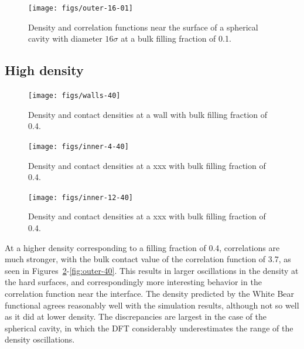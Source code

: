 \documentclass[letterpaper,twocolumn,amsmath,amssymb,jcp,10pt,aip]{revtex4-1}
\begin{document}
\begin{figure}
  \texttt{[image: figs/outer-16-01]}
  \caption{Density and correlation functions near the surface of a
    spherical cavity with diameter $16\sigma$ at a bulk filling
    fraction of 0.1.}
  \label{fig:outer-10}
\end{figure}





\subsection{High density}

\begin{figure}
  \texttt{[image: figs/walls-40]}
  \caption{Density and contact densities at a wall with bulk filling
    fraction of 0.4.}
  \label{fig:walls-40}
\end{figure}

\begin{figure}
  \texttt{[image: figs/inner-4-40]}
  \caption{Density and contact densities at a xxx with bulk filling
    fraction of 0.4.}
  \label{fig:inner-4-40}
\end{figure}

\begin{figure}
  \texttt{[image: figs/inner-12-40]}
  \caption{Density and contact densities at a xxx with bulk filling
    fraction of 0.4.}
  \label{fig:inner-12-40}
\end{figure}

At a higher density corresponding to a filling fraction of 0.4,
correlations are much stronger, with the bulk contact value of the
correlation function of 3.7, as seen in
Figures~\ref{fig:walls-40}-\ref{fig:outer-40}.  This results in larger
oscillations in the density at the hard surfaces, and correspondingly
more interesting behavior in the correlation function near the
interface.  The density predicted by the White Bear functional agrees
reasonably well with the simulation results, although not so well as
it did at lower density.  The discrepancies are largest in the case of
the spherical cavity, in which the DFT considerably underestimates the
range of the density oscillations.
\end{document}
